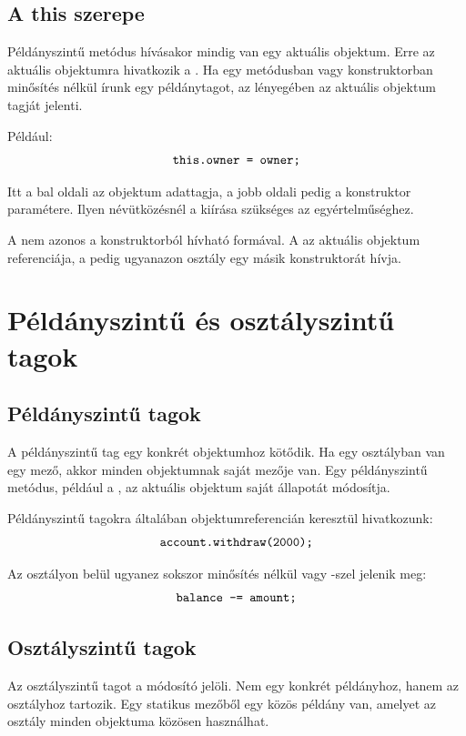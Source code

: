 

\subsection{A this szerepe}

Példányszintű metódus hívásakor mindig van egy aktuális objektum. Erre az aktuális objektumra hivatkozik a . Ha egy metódusban vagy konstruktorban minősítés nélkül írunk egy példánytagot, az lényegében az aktuális objektum tagját jelenti.

Például:
\[
  \texttt{this.owner = owner;}
\]

Itt a bal oldali  az objektum adattagja, a jobb oldali  pedig a konstruktor paramétere. Ilyen névütközésnél a  kiírása szükséges az egyértelműséghez.

A  nem azonos a konstruktorból hívható  formával. A  az aktuális objektum referenciája, a  pedig ugyanazon osztály egy másik konstruktorát hívja.

\section{Példányszintű és osztályszintű tagok}

\subsection{Példányszintű tagok}

A példányszintű tag egy konkrét objektumhoz kötődik. Ha egy osztályban van egy  mező, akkor minden  objektumnak saját  mezője van. Egy példányszintű metódus, például a , az aktuális objektum saját állapotát módosítja.

Példányszintű tagokra általában objektumreferencián keresztül hivatkozunk:
\[
  \texttt{account.withdraw(2000);}
\]

Az osztályon belül ugyanez sokszor minősítés nélkül vagy -szel jelenik meg:
\[
  \texttt{balance -= amount;}
\]

\subsection{Osztályszintű tagok}

Az osztályszintű tagot a  módosító jelöli. Nem egy konkrét példányhoz, hanem az osztályhoz tartozik. Egy statikus mezőből egy közös példány van, amelyet az osztály minden objektuma közösen használhat.

